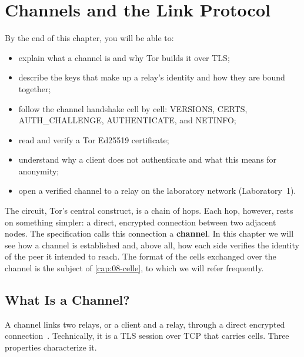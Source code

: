 \chapter{Channels and the Link Protocol}\label{cap:07-canali}

\begin{obiettivi}
By the end of this chapter, you will be able to:
\begin{itemize}[nosep]
  \item explain what a channel is and why Tor builds it over TLS;
  \item describe the keys that make up a relay's identity and how they are bound together;
  \item follow the channel handshake cell by cell: VERSIONS, CERTS, AUTH\_CHALLENGE, AUTHENTICATE, and NETINFO;
  \item read and verify a Tor Ed25519 certificate;
  \item understand why a client does not authenticate and what this means for anonymity;
  \item open a verified channel to a relay on the laboratory network (Laboratory~1).
\end{itemize}
\end{obiettivi}

The circuit, Tor's central construct, is a chain of hops. Each hop, however, rests on something simpler: a direct, encrypted connection between two adjacent nodes. The specification calls this connection a \textbf{channel}. In this chapter we will see how a channel is established and, above all, how each side verifies the identity of the peer it intended to reach. The format of the cells exchanged over the channel is the subject of \cref{cap:08-celle}, to which we will refer frequently.

\section{What Is a Channel?}\label{sec:canale-def}

A channel links two relays, or a client and a relay, through a direct encrypted connection~. Technically, it is a TLS session over TCP that carries cells. Three properties characterize it.

